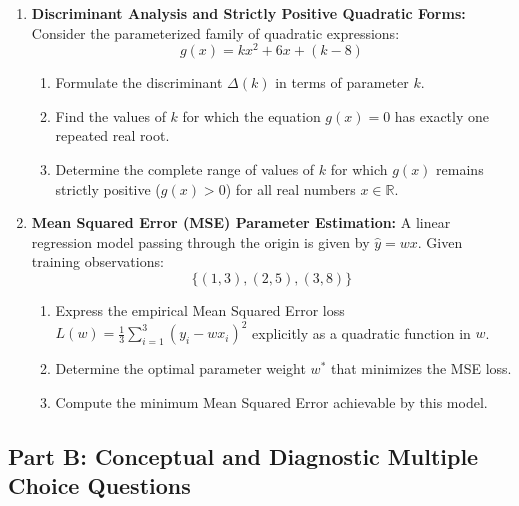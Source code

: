 \begin{enumerate}
    \item \textbf{Discriminant Analysis and Strictly Positive Quadratic Forms:} Consider the parameterized family of quadratic expressions:
    $$g(x) = k x^2 + 6x + (k - 8)$$
    \begin{enumerate}
        \item Formulate the discriminant $\Delta(k)$ in terms of parameter $k$.
        \item Find the values of $k$ for which the equation $g(x) = 0$ has exactly one repeated real root.
        \item Determine the complete range of values of $k$ for which $g(x)$ remains strictly positive ($g(x) > 0$) for all real numbers $x \in \mathbb{R}$.
    \end{enumerate}

    \item \textbf{Mean Squared Error (MSE) Parameter Estimation:} A linear regression model passing through the origin is given by $\hat{y} = w x$. Given training observations:
    $$\{(1, 3), (2, 5), (3, 8)\}$$
    \begin{enumerate}
        \item Express the empirical Mean Squared Error loss $L(w) = \frac{1}{3} \sum_{i=1}^3 (y_i - w x_i)^2$ explicitly as a quadratic function in $w$.
        \item Determine the optimal parameter weight $w^*$ that minimizes the MSE loss.
        \item Compute the minimum Mean Squared Error achievable by this model.
    \end{enumerate}
\end{enumerate}

\subsection*{Part B: Conceptual and Diagnostic Multiple Choice Questions}

